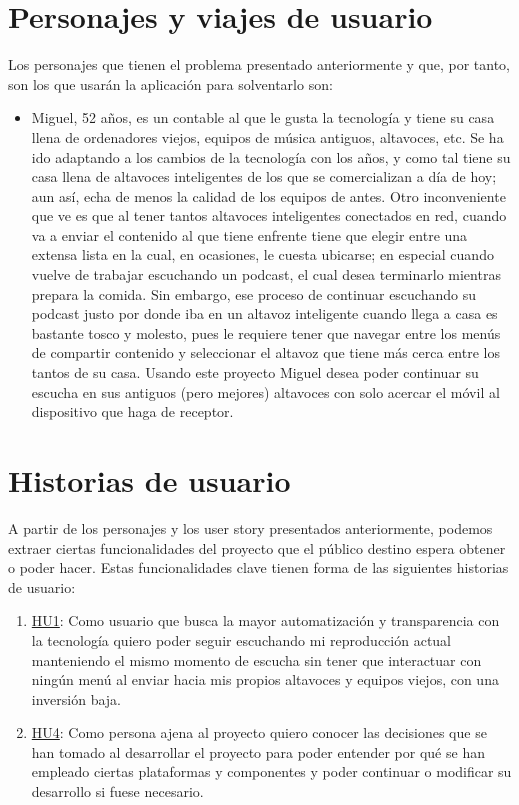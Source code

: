 \section{Personajes y viajes de usuario}
Los personajes que tienen el problema presentado anteriormente y que, por tanto,
son los que usarán la aplicación para solventarlo son:
\begin{itemize}
    \item Miguel, 52 años, es un contable al que le gusta la tecnología y tiene
    su casa llena de ordenadores viejos, equipos de música antiguos, altavoces,
    etc. Se ha ido adaptando a los cambios de la tecnología con los años, y como
    tal tiene su casa llena de altavoces inteligentes de los que se
    comercializan a día de hoy; aun así, echa de menos la calidad de los equipos
    de antes. Otro inconveniente que ve es que al tener tantos altavoces
    inteligentes conectados en red, cuando va a enviar el contenido al que tiene
    enfrente tiene que elegir entre una extensa lista en la cual, en ocasiones,
    le cuesta ubicarse; en especial cuando vuelve de trabajar escuchando un
    podcast, el cual desea terminarlo mientras prepara la comida. Sin embargo,
    ese proceso de continuar escuchando su podcast justo por donde iba en un
    altavoz inteligente cuando llega a casa es bastante tosco y molesto, pues le
    requiere tener que navegar entre los menús de compartir contenido y
    seleccionar el altavoz que tiene más cerca entre los tantos de su casa.
    Usando este proyecto Miguel desea poder continuar su escucha en sus antiguos
    (pero mejores) altavoces con solo acercar el móvil al dispositivo que haga
    de receptor.
\end{itemize}



\section{Historias de usuario}
A partir de los personajes y los user story presentados anteriormente, podemos
extraer ciertas funcionalidades del proyecto que el público destino espera
obtener o poder hacer. Estas funcionalidades clave tienen forma de las
siguientes historias de usuario:

\begin{enumerate}
    \item
    \href{https://github.com/migueorg/One-touch-music-streaming-TFG-ETSIIT/issues/10}{HU1}:
    Como usuario que busca la mayor automatización y transparencia con la
    tecnología quiero poder seguir escuchando mi reproducción actual manteniendo
    el mismo momento de escucha sin tener que interactuar con ningún menú al
    enviar hacia mis propios altavoces y equipos viejos, con una inversión baja.
    \item
    \href{https://github.com/migueorg/One-touch-music-streaming-TFG-ETSIIT/issues/14}{HU4}:
    Como persona ajena al proyecto quiero conocer las decisiones que se han
    tomado al desarrollar el proyecto para poder entender por qué se han
    empleado ciertas plataformas y componentes y poder continuar o modificar su
    desarrollo si fuese necesario.
\end{enumerate}

